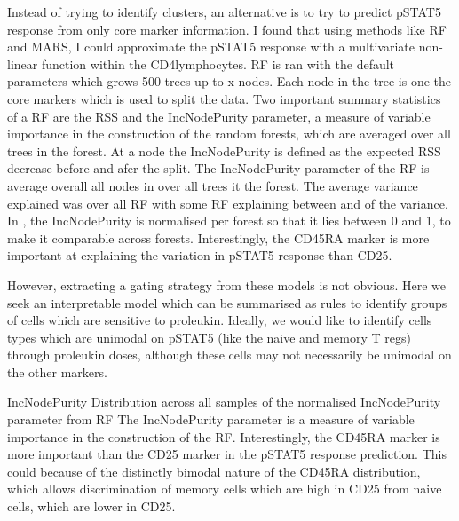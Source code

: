 Instead of trying to identify clusters, an alternative is to try to predict pSTAT5 response from only core marker information.
I found that using methods like \gls{RF} and \gls{MARS},
I could approximate the pSTAT5 response with a multivariate non-linear function within
the CD4\positive lymphocytes.
\gls{RF} is ran with the default parameters which grows 500 trees up to x nodes.
Each node in the tree is one the core markers which is used to split the data.
Two important summary statistics of a RF are the \gls{RSS} and the IncNodePurity parameter, a measure of variable importance in the
construction of the random forests, which are averaged over all trees in the forest.
At a node the IncNodePurity is defined as the expected \gls{RSS} decrease before and afer the split.
The IncNodePurity parameter of the RF is average overall all nodes in over all trees it the forest.
The average variance explained was  over all \gls{RF} with some \gls{RF} explaining between  and  of the variance.
In , the IncNodePurity is normalised per forest so that it lies between 0 and 1, to make it comparable across forests.
Interestingly, the CD45RA marker is more important at explaining the variation in pSTAT5 response than CD25.

However, extracting a gating strategy from these models is not obvious.
Here we seek an interpretable model which can be summarised as rules to identify groups of cells which are sensitive to proleukin.
Ideally, we would like to identify cells types which are unimodal on pSTAT5 (like the naive and memory T regs) through proleukin doses,
although these cells may not necessarily be unimodal on the other markers.

{IncNodePurity}
{
  Distribution across all samples of the normalised IncNodePurity parameter from \acrfull{RF}
}
{
  The IncNodePurity parameter is a measure of variable importance in the construction of the \acrfull{RF}.
  Interestingly, the CD45RA marker is more important than the CD25 marker in the pSTAT5 response prediction.
  This could because of the distinctly bimodal nature of the CD45RA distribution, which allows discrimination of memory cells which are high in CD25
  from naive cells, which are lower in CD25.
}


